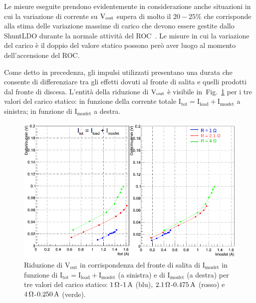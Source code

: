 Le misure eseguite prendono evidentemente in considerazione anche situazioni in cui la variazione di corrente su $\mathrm{V_{out}}$ supera di molto il $20-25\%$ che corrisponde alla stima delle  variazione massime di carico che devono essere gestite dallo ShuntLDO durante la normale attivit\`a del ROC~\cite{saramarconi}. Le misure in cui la variazione del carico è il doppio del valore statico possono per\`o aver luogo al momento dell'accensione del ROC. %

Come detto in precedenza, gli impulsi utilizzati presentano una durata che consente di differenziare tra gli effetti dovuti al fronte di salita e quelli prodotti dal fronte di discesa. 
L'entit\`a della riduzione di $\mathrm{V_{out}}$ \`e visibile in~Fig.~\ref{VoutUnd} per i tre valori del carico statico: in funzione della corrente totale $\mathrm{I_{tot} = I_{load}+I_{mosfet}}$ a sinistra; in funzione di $\mathrm{I_{mosfet}}$ a destra. 
\begin{figure}
\centering
\includegraphics[width=0.9\linewidth]{Immagini/VoutUnd}
\caption{Riduzione di $\mathrm{V_{out}}$ in corrispondenza del fronte di salita di $\mathrm{I_{mosfet}}$ in funzione di $\mathrm{I_{tot} = I_{load}+I_{mosfet}}$ (a sinistra) e di $\mathrm{I_{mosfet}}$ (a destra) per tre valori del carico statico: $1{\rm \, \Omega}$-$1\rm \, A$ (blu), $2.1{\rm \, \Omega}$-$0.475\rm \, A$ (rosso) e $4{\rm \, \Omega}$-$0.250\rm \, A$ (verde).}
\label{VoutUnd}
\end{figure}
